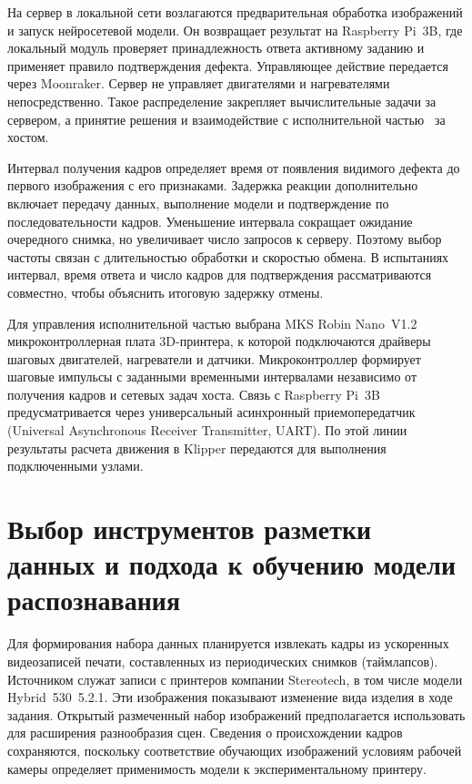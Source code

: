 На сервер в локальной сети возлагаются предварительная обработка изображений и запуск нейросетевой модели. Он возвращает результат на Raspberry Pi~3B, где локальный модуль проверяет принадлежность ответа активному заданию и применяет правило подтверждения дефекта. Управляющее действие передается через Moonraker. Сервер не управляет двигателями и нагревателями непосредственно. Такое распределение закрепляет вычислительные задачи за сервером, а принятие решения и взаимодействие с исполнительной частью~\textemdash{} за хостом.

Интервал получения кадров определяет время от появления видимого дефекта до первого изображения с его признаками. Задержка реакции дополнительно включает передачу данных, выполнение модели и подтверждение по последовательности кадров. Уменьшение интервала сокращает ожидание очередного снимка, но увеличивает число запросов к серверу. Поэтому выбор частоты связан с длительностью обработки и скоростью обмена. В испытаниях интервал, время ответа и число кадров для подтверждения рассматриваются совместно, чтобы объяснить итоговую задержку отмены.

Для управления исполнительной частью выбрана MKS Robin Nano~V1.2~\textemdash{} микроконтроллерная плата 3D-принтера, к которой подключаются драйверы шаговых двигателей, нагреватели и датчики. Микроконтроллер формирует шаговые импульсы с заданными временными интервалами независимо от получения кадров и сетевых задач хоста. Связь с Raspberry Pi~3B предусматривается через универсальный асинхронный приемопередатчик (Universal Asynchronous Receiver Transmitter, UART). По этой линии результаты расчета движения в Klipper передаются для выполнения подключенными узлами.

\section{Выбор инструментов разметки данных и подхода к обучению модели распознавания}

Для формирования набора данных планируется извлекать кадры из ускоренных видеозаписей печати, составленных из периодических снимков (таймлапсов). Источником служат записи с принтеров компании Stereotech, в том числе модели Hybrid~530~5.2.1. Эти изображения показывают изменение вида изделия в ходе задания. Открытый размеченный набор изображений предполагается использовать для расширения разнообразия сцен. Сведения о происхождении кадров сохраняются, поскольку соответствие обучающих изображений условиям рабочей камеры определяет применимость модели к экспериментальному принтеру.

